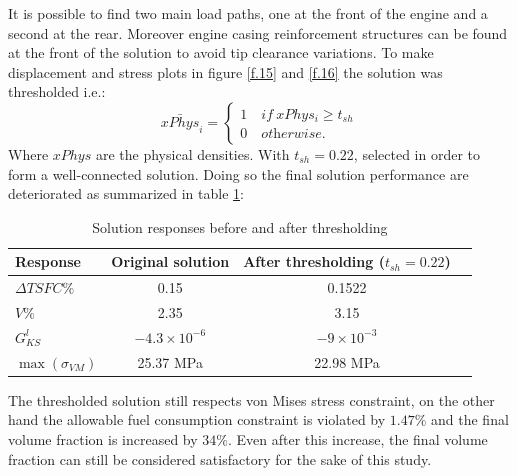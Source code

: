   It is possible to find two main load paths, one at the front of the engine and a second at the rear. Moreover engine casing reinforcement structures can be found at the front of the solution to avoid tip clearance variations. 
 To make displacement and stress plots in figure \ref{f.15} and \ref{f.16} the solution was thresholded i.e.: 
  \begin{equation}
      \bar{xPhys}_i=\begin{cases}
             1 \quad \textit{if} \ xPhys_i\geq t_{sh}\\
             0 \quad \textit{otherwise.}
             \end{cases}
  \end{equation}
  Where $xPhys$ are the physical densities.
  With $t_{sh}=0.22$, selected in order to form a well-connected solution.
  Doing so the final solution performance are deteriorated as summarized in table \ref{tab:table3}:\\
  \begin{table}[h]
         \caption{\label{tab:table3} Solution responses before and after thresholding }
          \centering
          \begin{tabular}{lccc}
          \hline
           Response& Original solution& After thresholding ($t_{sh}=0.22$) \\\hline
         $\Delta TSFC \%$ & 0.15 & 0.1522 \\
         $V \%$ & 2.35 & 3.15 \\
         $G_{KS}^l$ & $-4.3\times 10^{-6}$ & $-9\times 10^{-3}$ \\
        $\max(\sigma_{VM})$ & 25.37 MPa & 22.98 MPa \\
          \hline
          \end{tabular}
          \end{table} 
 The thresholded solution still respects von Mises stress constraint, on the other hand the allowable fuel consumption constraint is violated by $1.47\%$ and the final volume fraction is increased by $34\%$. Even after this increase, the final volume fraction can still be considered satisfactory for the sake of this study. 
 
